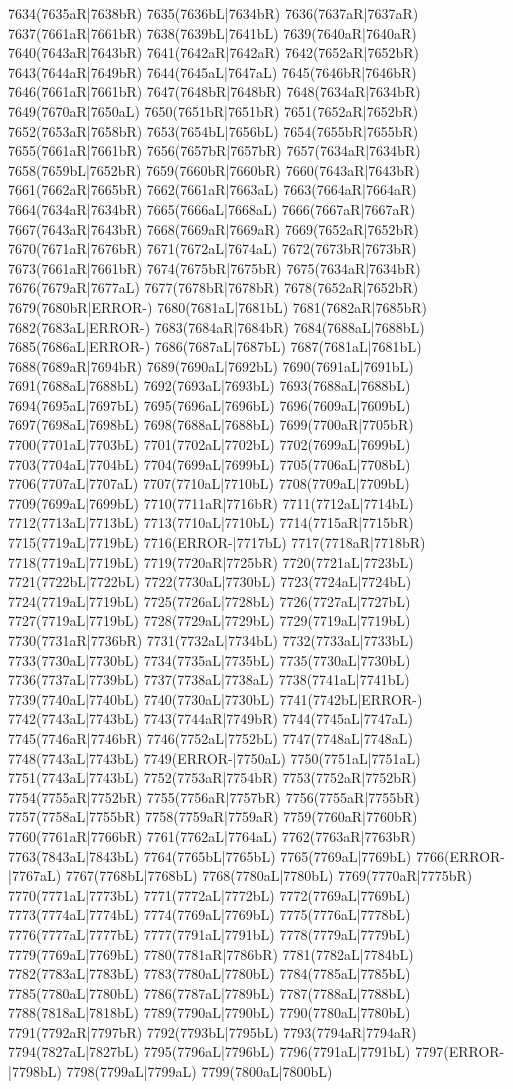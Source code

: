 7634(7635aR|7638bR) 7635(7636bL|7634bR) 7636(7637aR|7637aR) 7637(7661aR|7661bR) 7638(7639bL|7641bL) 7639(7640aR|7640aR) 7640(7643aR|7643bR) 7641(7642aR|7642aR) 7642(7652aR|7652bR) 7643(7644aR|7649bR) 7644(7645aL|7647aL) 7645(7646bR|7646bR) 7646(7661aR|7661bR) 7647(7648bR|7648bR) 7648(7634aR|7634bR) 7649(7670aR|7650aL) 7650(7651bR|7651bR) 7651(7652aR|7652bR) 7652(7653aR|7658bR) 7653(7654bL|7656bL) 7654(7655bR|7655bR) 7655(7661aR|7661bR) 7656(7657bR|7657bR) 7657(7634aR|7634bR) 7658(7659bL|7652bR) 7659(7660bR|7660bR) 7660(7643aR|7643bR) 7661(7662aR|7665bR) 7662(7661aR|7663aL) 7663(7664aR|7664aR) 7664(7634aR|7634bR) 7665(7666aL|7668aL) 7666(7667aR|7667aR) 7667(7643aR|7643bR) 7668(7669aR|7669aR) 7669(7652aR|7652bR) 7670(7671aR|7676bR) 7671(7672aL|7674aL) 7672(7673bR|7673bR) 7673(7661aR|7661bR) 7674(7675bR|7675bR) 7675(7634aR|7634bR) 7676(7679aR|7677aL) 7677(7678bR|7678bR) 7678(7652aR|7652bR) 7679(7680bR|ERROR-) 7680(7681aL|7681bL) 7681(7682aR|7685bR) 7682(7683aL|ERROR-) 7683(7684aR|7684bR) 7684(7688aL|7688bL) 7685(7686aL|ERROR-) 7686(7687aL|7687bL) 7687(7681aL|7681bL) 7688(7689aR|7694bR) 7689(7690aL|7692bL) 7690(7691aL|7691bL) 7691(7688aL|7688bL) 7692(7693aL|7693bL) 7693(7688aL|7688bL) 7694(7695aL|7697bL) 7695(7696aL|7696bL) 7696(7609aL|7609bL) 7697(7698aL|7698bL) 7698(7688aL|7688bL) 7699(7700aR|7705bR) 7700(7701aL|7703bL) 7701(7702aL|7702bL) 7702(7699aL|7699bL) 7703(7704aL|7704bL) 7704(7699aL|7699bL) 7705(7706aL|7708bL) 7706(7707aL|7707aL) 7707(7710aL|7710bL) 7708(7709aL|7709bL) 7709(7699aL|7699bL) 7710(7711aR|7716bR) 7711(7712aL|7714bL) 7712(7713aL|7713bL) 7713(7710aL|7710bL) 7714(7715aR|7715bR) 7715(7719aL|7719bL) 7716(ERROR-|7717bL) 7717(7718aR|7718bR) 7718(7719aL|7719bL) 7719(7720aR|7725bR) 7720(7721aL|7723bL) 7721(7722bL|7722bL) 7722(7730aL|7730bL) 7723(7724aL|7724bL) 7724(7719aL|7719bL) 7725(7726aL|7728bL) 7726(7727aL|7727bL) 7727(7719aL|7719bL) 7728(7729aL|7729bL) 7729(7719aL|7719bL) 7730(7731aR|7736bR) 7731(7732aL|7734bL) 7732(7733aL|7733bL) 7733(7730aL|7730bL) 7734(7735aL|7735bL) 7735(7730aL|7730bL) 7736(7737aL|7739bL) 7737(7738aL|7738aL) 7738(7741aL|7741bL) 7739(7740aL|7740bL) 7740(7730aL|7730bL) 7741(7742bL|ERROR-) 7742(7743aL|7743bL) 7743(7744aR|7749bR) 7744(7745aL|7747aL) 7745(7746aR|7746bR) 7746(7752aL|7752bL) 7747(7748aL|7748aL) 7748(7743aL|7743bL) 7749(ERROR-|7750aL) 7750(7751aL|7751aL) 7751(7743aL|7743bL) 7752(7753aR|7754bR) 7753(7752aR|7752bR) 7754(7755aR|7752bR) 7755(7756aR|7757bR) 7756(7755aR|7755bR) 7757(7758aL|7755bR) 7758(7759aR|7759aR) 7759(7760aR|7760bR) 7760(7761aR|7766bR) 7761(7762aL|7764aL) 7762(7763aR|7763bR) 7763(7843aL|7843bL) 7764(7765bL|7765bL) 7765(7769aL|7769bL) 7766(ERROR-|7767aL) 7767(7768bL|7768bL) 7768(7780aL|7780bL) 7769(7770aR|7775bR) 7770(7771aL|7773bL) 7771(7772aL|7772bL) 7772(7769aL|7769bL) 7773(7774aL|7774bL) 7774(7769aL|7769bL) 7775(7776aL|7778bL) 7776(7777aL|7777bL) 7777(7791aL|7791bL) 7778(7779aL|7779bL) 7779(7769aL|7769bL) 7780(7781aR|7786bR) 7781(7782aL|7784bL) 7782(7783aL|7783bL) 7783(7780aL|7780bL) 7784(7785aL|7785bL) 7785(7780aL|7780bL) 7786(7787aL|7789bL) 7787(7788aL|7788bL) 7788(7818aL|7818bL) 7789(7790aL|7790bL) 7790(7780aL|7780bL) 7791(7792aR|7797bR) 7792(7793bL|7795bL) 7793(7794aR|7794aR) 7794(7827aL|7827bL) 7795(7796aL|7796bL) 7796(7791aL|7791bL) 7797(ERROR-|7798bL) 7798(7799aL|7799aL) 7799(7800aL|7800bL) 